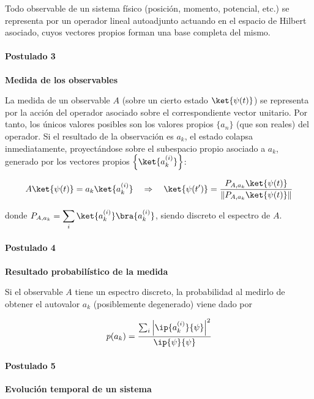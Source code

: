 \documentclass[11pt,a4paper,twoside,pdf]{article}
\numberwithin{equation}{section}
\begin{document}
			Todo observable de un sistema físico (posición, momento, potencial, etc.) se representa por un operador lineal autoadjunto actuando en el espacio de Hilbert asociado, cuyos vectores propios forman una base completa del mismo. 	
			  
		\paragraph{Postulado 3}\label{Par: Postulado 3} \textbf{Medida de los observables}
			
			La medida de un observable $A$ (sobre un cierto estado $\ket{\psi(t)}$) se representa por la acción del operador asociado sobre el correspondiente vector unitario. Por tanto, los únicos valores posibles son los valores propios $\{a_n\}$ (que son reales) del operador. Si el resultado de la observación es $a_k$, el estado colapsa inmediatamente, proyectándose sobre el subespacio propio asociado a $a_k$, generado por los vectores propios $\left\{\ket{a_k^{(i)}}\right\}$:
			
				\begin{equation}
				  A \ket{\psi(t)} = a_k \ket{a_k^{(i)}}
			    	 	\quad \Rightarrow \quad 
			  		 \ket{\psi(t')} = \frac{P_{A,a_k} \ket{\psi(t)}}{\| P_{A,a_k} \ket{\psi(t)}\|}
				\end{equation}
									
			donde $P_{A,a_k} = \displaystyle\sum_i \ket{a_k^{(i)}} \bra{a_k^{(i)}}$, siendo discreto el espectro de $A$.
			  
		\paragraph{Postulado 4}\label{Par: Postulado 4} \textbf{Resultado probabilístico de la medida}
			
			Si el observable $A$ tiene un espectro discreto, la probabilidad al medirlo de obtener el autovalor $a_k$ (posiblemente degenerado) viene dado por
			
		   		\begin{equation}
		    		p(a_k)=\frac{ \sum_i \left| \ip{a_k^{(i)}}{\psi} \right|^2 }{\ip{\psi}{\psi}}
		   		\end{equation}	
			
		\paragraph{Postulado 5}\label{Par: Postulado 5} \textbf{Evolución temporal de un sistema}			
			
\end{document}
